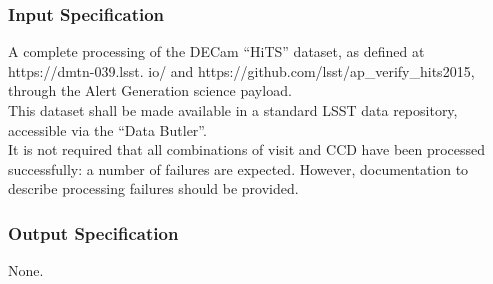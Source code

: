 \subsubsection{Input Specification}
A complete processing of the DECam ``HiTS'' dataset, as defined at
https://dmtn-039.lsst. io/ and
https://github.com/lsst/ap\_verify\_hits2015, through the Alert
Generation science payload.\\
This dataset shall be made available in a standard LSST data repository,
accessible via the ``Data Butler''.\\
It is not required that all combinations of visit and CCD have been
processed successfully: a number of failures are expected. However,
documentation to describe processing failures should be provided.


\subsubsection{Output Specification}
None.


